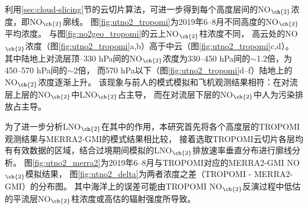 利用\ref{sec:cloud-slicing}节的云切片算法，可进一步得到每个高度层间的NO$_{\ch{2}}$浓度，即NO$_{\ch{2}}$廓线。
图\ref{fig:utno2_tropomi}为2019年6--8月不同高度的NO$_{\ch{2}}$平均浓度。
与图\ref{fig:no2geo_tropomi}的云上NO$_{\ch{2}}$柱浓度不同，
高云处的NO$_{\ch{2}}$浓度（图\ref{fig:utno2_tropomi}a,b）高于中云（图\ref{fig:utno2_tropomi}c,d）。
其中陆地上对流层顶--330 hPa间的NO$_{\ch{2}}$浓度为330--450 hPa间的$\sim$1.2倍，为450--570 hPa间的$\sim$2倍，
而570 hPa以下（图\ref{fig:utno2_tropomi}d--f）陆地上的NO$_{\ch{2}}$浓度逐渐上升。
该现象与前人的模式模拟和飞机观测结果相符：在对流层上层的NO$_{\ch{2}}$中LNO$_{\ch{2}}$占主导，
而在对流层下层的NO$_{\ch{2}}$中人为污染排放占主导\citep{Pickering.1996,Ott.2010,Laughner.2017}。

为了进一步分析LNO$_{\ch{2}}$在其中的作用，本研究首先将各个高度层的TROPOMI观测结果与MERRA2-GMI的模式结果相比较，
接着选取TROPOMI云切片各层均有有效数据的区域，结合过境期间模拟的LNO$_{\ch{2}}$排放速率垂直分布进行廓线分析。
图\ref{fig:utno2_merra2}为2019年6--8月与TROPOMI对应的MERRA2-GMI NO$_{\ch{2}}$模拟结果，
图\ref{fig:utno2_delta}为两者浓度之差（TROPOMI - MERRA2-GMI）的分布图。
其中海洋上的误差可能由TROPOMI NO$_{\ch{2}}$反演过程中低估的平流层NO$_{\ch{2}}$柱浓度或高估的辐射强度所导致\citep{VanGeffen.2020}。

